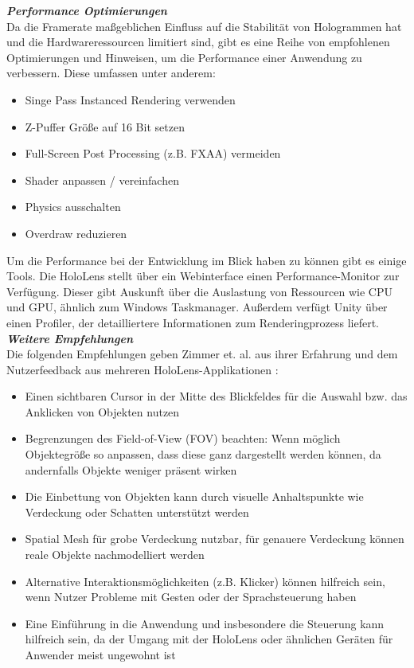 \textbf{\textit{Performance Optimierungen}}\\
Da die Framerate maßgeblichen Einfluss auf die Stabilität von Hologrammen hat und die Hardwareressourcen limitiert sind, gibt es eine Reihe von empfohlenen Optimierungen und Hinweisen, um die Performance einer Anwendung zu verbessern. Diese umfassen unter anderem:
\begin{itemize}
	\setlength{\itemsep}{-5pt}
	\item Singe Pass Instanced Rendering verwenden
	\item Z-Puffer Größe auf 16 Bit setzen
	\item Full-Screen Post Processing (z.B. FXAA) vermeiden
	\item Shader anpassen / vereinfachen
	\item Physics ausschalten
	\item Overdraw reduzieren
\end{itemize}
Um die Performance bei der Entwicklung im Blick haben zu können gibt es einige Tools. Die HoloLens stellt über ein Webinterface einen Performance-Monitor zur Verfügung. Dieser gibt Auskunft über die Auslastung von Ressourcen wie CPU und GPU, ähnlich zum Windows Taskmanager. Außerdem verfügt Unity über einen Profiler, der detailliertere Informationen zum Renderingprozess liefert.\\

\textbf{\textit{Weitere Empfehlungen}}\\
Die folgenden Empfehlungen geben Zimmer et. al. aus ihrer Erfahrung und dem Nutzerfeedback aus mehreren HoloLens-Applikationen \cite{Zimmer17}:
\begin{itemize}
	\item Einen sichtbaren Cursor in der Mitte des Blickfeldes für die Auswahl bzw. das Anklicken von Objekten nutzen
	\item Begrenzungen des Field-of-View (FOV) beachten: Wenn möglich Objektegröße so anpassen, dass diese ganz dargestellt werden können, da andernfalls Objekte weniger präsent wirken
	\item Die Einbettung von Objekten kann durch visuelle Anhaltspunkte wie Verdeckung oder Schatten unterstützt werden
	\item Spatial Mesh für grobe Verdeckung nutzbar, für genauere Verdeckung können reale Objekte nachmodelliert werden 
	\item Alternative Interaktionsmöglichkeiten (z.B. Klicker) können hilfreich sein, wenn Nutzer Probleme mit Gesten oder der Sprachsteuerung haben
	\item Eine Einführung in die Anwendung und insbesondere die Steuerung kann hilfreich sein, da der Umgang mit der HoloLens oder ähnlichen Geräten für Anwender meist ungewohnt ist
\end{itemize}




